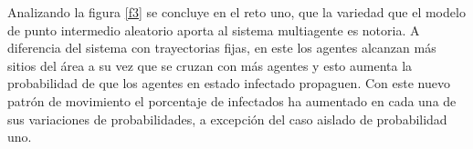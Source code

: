 \documentclass{article}
\begin{document}
Analizando la figura \ref{f3} se concluye en el reto uno, que la variedad que el modelo de punto intermedio aleatorio aporta al sistema multiagente es notoria. A diferencia del sistema con trayectorias fijas, en este los agentes alcanzan m\'as sitios del \'area a su vez que se cruzan con m\'as agentes y esto aumenta la probabilidad de que los agentes en estado infectado propaguen. Con este nuevo patr\'on de movimiento el porcentaje de infectados ha aumentado en cada una de sus variaciones de probabilidades, a excepci\'on del caso aislado de probabilidad uno.


  
  
\end{document}

